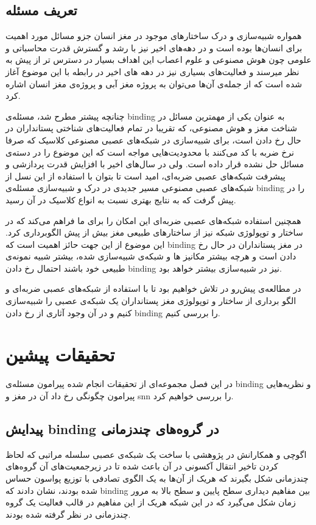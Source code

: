 \documentclass[12pt]{report}
\begin{document}
	\section{تعریف مسئله}
	همواره شبیه‌سازی و درک ساختار‌های موجود در مغز انسان جزو مسائل مورد اهمیت برای انسان‌ها بوده است و در دهه‌های اخیر نیز با رشد و گسترش قدرت محاسباتی و علومی چون هوش مصنوعی و علوم اعصاب این اهداف بسیار در دسترس تر از پیش به نظر میرسند و فعالیت‌های بسیاری نیز در دهه های اخیر در رابطه با این موضوع آغاز شده است که از جمله‌ی آن‌ها می‌توان به پروژه مغز آبی و پروژه‌ی مغز انسان اشاره کرد.
	
	چنانچه پیشتر مطرح شد، مسئله‌ی \gls{binding} به عنوان یکی از مهمترین مسائل در شناخت مغز و هوش مصنوعی، که تقریبا در تمام فعالیت‌های شناختی پستانداران در حال رخ دادن است، برای شبیه‌سازی در شبکه‌های عصبی مصنوعی کلاسیک که صرفا نرخ ضربه با کد می‌کنند با محدودیت‌هایی مواجه است \cite{vonderMalsburg1999} که این موضوع را در دسته‌ی مسائل حل نشده قرار داده است. ولی در سال‌های اخیر با افزایش قدرت پردازشی و پیشرفت شبکه‌های عصبی ضربه‌ای‌، امید است تا بتوان با استفاده از این نسل از شبکه‌های عصبی مصنوعی مسیر جدیدی در درک و شبیه‌سازی مسئله‌ی \gls{binding} را در پیش گرفت که به نتایج بهتری نسبت به انواع کلاسیک در آن رسید.
	
	همچنین استفاده شبکه‌های عصبی ضربه‌ای این امکان را برای ما فراهم می‌کند که در ساختار و توپولوژی شبکه نیز از ساختار‌های طبیعی مغز بیش از پیش الگوبرداری کرد. این موضوع از این جهت  حائز اهمیت است که \gls{binding} در مغز پستانداران در حال رخ دادن است و هرچه بیشتر مکانیز ها و شبکه‌ی شبیه‌سازی شده، بیشتر شبیه نمونه‌ی طبیعی خود باشند احتمال رخ دادن \gls{binding} نیز در شبیه‌سازی بیشتر خواهد بود.
	
	در مطالعه‌ی پیش‌رو در تلاش خواهیم بود تا با استفاده از شبکه‌های عصبی ضربه‌ای و الگو برداری از ساختار و توپولوژی مغز پستانداران یک شبکه‌ی عصبی را شبیه‌سازی کنیم و در آن وجود آثاری از رخ دادن \gls{binding} را بررسی کنیم.
	
	
	\chapter{تحقیقات پیشین}
	
	در این فصل مجموعه‌ای از تحقیقات انجام شده پیرامون مسئله‌ی \gls{binding} و نظریه‌هایی پیرامون چگونگی رخ داد آن در مغز و \gls{snn} را بررسی خواهیم کرد.
	
	
	\section{پیدایش \gls{binding} در گروه‌های چندزمانی}
	اگوچی و همکارانش در پژوهشی
	\cite{EGUCHI2018a}
	با ساخت یک شبکه‌ی عصبی سلسله مراتبی که لحاظ کردن تاخیر انتقال آکسونی در آن باعث شده تا در زیرجمعیت‌های آن گروه‌های چندزمانی\cite{Izhikevich2006-dy} شکل بگیرند که هریک از آن‌ها به یک الگوی تصادفی با توزیع پواسون حساس شده بودند، نشان دادند که \gls{binding} بین مفاهیم دیداری سطح پایین و سطح بالا به مرور زمان شکل می‌گیرد که در این شبکه هریک از این مفاهیم در قالب فعالیت یک گروه چندزمانی در نظر گرفته شده بودند.
	
\end{document}
